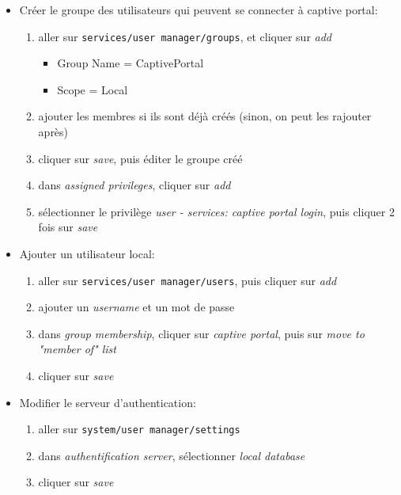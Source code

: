 \documentclass[a4paper]{article}
\begin{document}
\begin{itemize}
\item Créer le groupe des utilisateurs qui peuvent se connecter à captive portal:
\begin{enumerate}
    \item aller sur \texttt{services/user manager/groups}, et cliquer sur \textit{add}
    \begin{itemize}
        \item Group Name = CaptivePortal
        \item Scope = Local
    \end{itemize}
    \item ajouter les membres si ils sont déjà créés (sinon, on peut les rajouter après)
    \item cliquer sur \textit{save}, puis éditer le groupe créé
    \item dans \textit{assigned privileges}, cliquer sur \textit{add}
    \item sélectionner le privilège \textit{user - services: captive portal login}, puis cliquer 2 fois sur \textit{save}
\end{enumerate}

\item Ajouter un utilisateur local:
\begin{enumerate}
    \item aller sur \texttt{services/user manager/users}, puis cliquer sur \textit{add}
    \item ajouter un \textit{username} et un mot de passe
    \item dans \textit{group membership}, cliquer sur \textit{captive portal}, puis sur \textit{move to "member of" list}
    \item cliquer sur \textit{save}
\end{enumerate}

\item Modifier le serveur d'authentication:
\begin{enumerate}
    \item aller sur \texttt{system/user manager/settings}
    \item dans \textit{authentification server}, sélectionner \textit{local database}
    \item cliquer sur \textit{save}
\end{enumerate}

\end{itemize}
\end{document}
